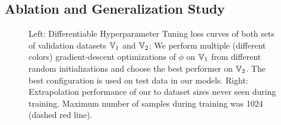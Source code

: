 \documentclass{article}
\begin{document}




\subsection{Ablation and Generalization Study}
\begin{figure}[t]
     \centering
     \begin{subfigure}[b]{.49\textwidth}
         
     \end{subfigure}
     \begin{subfigure}[b]{.49\textwidth}
         
     \end{subfigure}
     \caption{Left: Differentiable Hyperparameter Tuning loss curves of both sets of validation datasets $\mathbb{V}_1$ and $\mathbb{V}_2$: We perform multiple (different colors) gradient-descent optimizations of $\phi$ on $\mathbb{V}_1$ from different random initializations and choose the best performer on $\mathbb{V}_2$. The best configuration is used on test data in our models. Right: Extrapolation performance of our \methodname{} to dataset sizes never seen during training. Maximum number of samples during training was 1024 (dashed red line).}
    \label{fig:diffable_train_valid}
    \label{fig:model generalization}
\end{figure}
\end{document}
